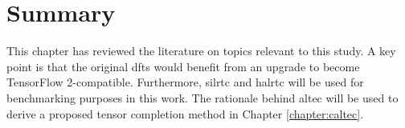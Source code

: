 \section{Summary} \label{sec:background:summary}

This chapter has reviewed the literature on topics relevant to this study. A key point is that the original \gls{dfts} would benefit from an upgrade to become TensorFlow 2-compatible. Furthermore, \gls{silrtc} and \gls{halrtc} will be used for benchmarking purposes in this work. The rationale behind \gls{altec} will be used to derive a proposed tensor completion method in Chapter \ref{chapter:caltec}.